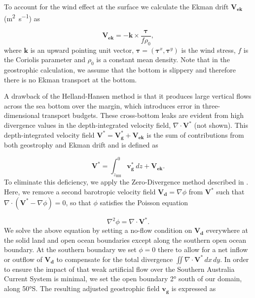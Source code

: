 \documentclass[preprint,3p,review,12pt]{elsarticle}
\renewcommand{\Vec}[1]{\mathbf{#1}}
\newcommand{\sub}[1]{_{\text{#1}}}
\begin{document}
To account for the wind effect at the surface we calculate the Ekman drift $\Vec{V\sub{ek}}$ (\si{\square\meter\per\second}) as

\begin{equation}
\Vec{V\sub{ek}} = -\Vec{k} \times \frac{\boldsymbol{\tau}}{f\rho\sub{0}},
\end{equation}
%
where $\Vec{k}$ is an upward pointing unit vector, $\boldsymbol{\tau}=(\boldsymbol{\tau}^{x},\boldsymbol{\tau}^{y})$ is the wind stress, $f$ is the Coriolis parameter and $\rho\sub{0}$ is a constant mean density. Note that in the geostrophic calculation, we assume that the bottom is slippery and therefore there is no Ekman transport at the bottom.

A drawback of the Helland-Hansen method is that it produces large vertical flows across the sea bottom over the margin, which introduces error in three-dimensional transport budgets. These cross-bottom leaks are evident from high divergence values in the depth-integrated velocity field, $\nabla\cdot\Vec{V}^{*}$ (not shown). This depth-integrated velocity field $\Vec{V}^{*}=\Vec{V\sub{g}^{*}}+\Vec{V\sub{ek}}$ is the sum of contributions from both geostrophy and Ekman drift and is defined as

\begin{equation}
\Vec{V}^{*} = \int_{z\sub{HH}}^{0}\Vec{v\sub{g}^{*}}\ dz + \Vec{V\sub{ek}}.
\end{equation}
%
To eliminate this deficiency, we apply the Zero-Divergence method described in \citet{Furue2017}. Here, we remove a second barotropic velocity field $\Vec{V\sub{d}}=\nabla\phi$ from $\Vec{V}^{*}$ such that $\nabla\cdot(\Vec{V}^{*}-\nabla\phi)=0$, so that $\phi$ satisfies the Poisson equation

\begin{equation}
\nabla^{2}\phi = \nabla\cdot\Vec{V}^{*}.
\end{equation}
%
We solve the above equation by setting a no-flow condition on $\Vec{V\sub{d}}$ everywhere at the solid land and open ocean boundaries except along the southern open ocean boundary. At the southern boundary we set $\phi=0$ there to allow for a net inflow or outflow of $\Vec{V\sub{d}}$ to compensate for the total divergence $\iint\nabla\cdot\Vec{V}^{*}\,dx\,dy$. In order to ensure the impact of that weak artificial flow over the Southern Australia Current System is minimal, we set the open boundary \ang{2} south of our domain, along \ang{50}S. The resulting adjusted geostrophic field $\Vec{v\sub{g}}$ is expressed as
\end{document}
